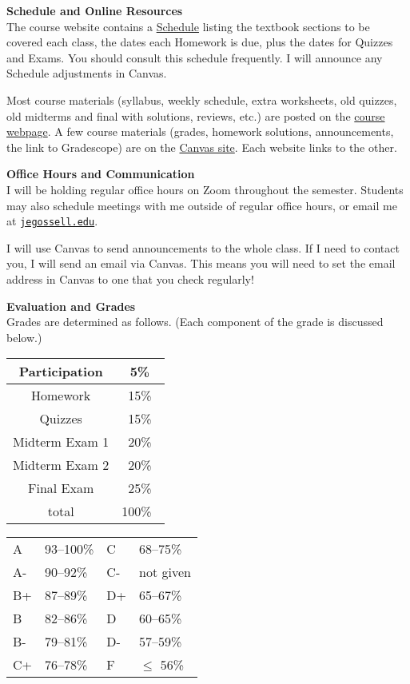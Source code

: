 \documentclass[12pt]{article}
\renewcommand{\emph}[1]{\textsf{\textbf{#1}}}
\newcommand{\localhead}[1]{\par\smallskip\textbf{#1} \smallskip\nobreak\\}%
\def\heading#1{\localhead{\large\emph{#1}}}
\begin{document}
\pagebreak

\heading{Schedule and Online Resources}
The course website contains a \href{https://docs.google.com/spreadsheets/d/e/2PACX-1vSetyTdOP14yatuWNH7CuB9yCT3zqOhFWYmCj1BzRAZhU4eHCXCJaRjnCgxgZW_NieE59iLRok3NdzK/pubhtml?gid=0&single=true}{Schedule} listing the textbook sections to be covered each class, the dates each Homework is due, plus the dates for Quizzes and Exams. You should consult this schedule frequently.  I will announce any Schedule adjustments in Canvas.

Most course materials (syllabus, weekly schedule, extra worksheets, old quizzes, old midterms and final with solutions, reviews, etc.) are posted on the \href{https://uaf-math251.github.io/calc2/}{course webpage}.  A few course materials (grades, homework solutions, announcements, the link to Gradescope) are on the \href{https://canvas.alaska.edu/courses/21589}{Canvas site}.  Each website links to the other.


\heading{Office Hours and Communication}
I will be holding regular office hours on Zoom throughout the semester. Students may also schedule meetings with me outside of regular office hours, or email me at \href{mailto:jegossell@alaska.edu}{\texttt{jegossell\@@alaska.edu}}.

I will use Canvas to send announcements to the whole class. If I need to contact you, I will send an email via Canvas.  This means you will need to set the email address in Canvas to one that you check regularly!


\heading{Evaluation and Grades}
Grades are determined as follows.  (Each component of the grade is discussed below.)
 
\begin{multicols}{2}
\begin{tabular}{|c|c|}
\hline
Participation & 5\%\\
\hline
Homework & 15\% \\
\hline
Quizzes & 15\% \\
\hline
Midterm Exam 1 & 20\% \\
\hline
Midterm Exam 2 & 20\%  \\
\hline
Final Exam & 25\% \\
\hline
total & 100\% \, \\
\hline
\end{tabular}


\begin{tabular}{llll}
A  & 93--100\%& C  & 68--75\%  \\
A- & 90--92\% & C- & not given \\
B+ & 87--89\% & D+ & 65--67\%  \\
B  & 82--86\% & D  & 60--65\%  \\
B- & 79--81\% & D- & 57--59\%  \\
C+ & 76--78\% & F  & $\le$ 56\%
\end{tabular}
\end{multicols}
\end{document}
